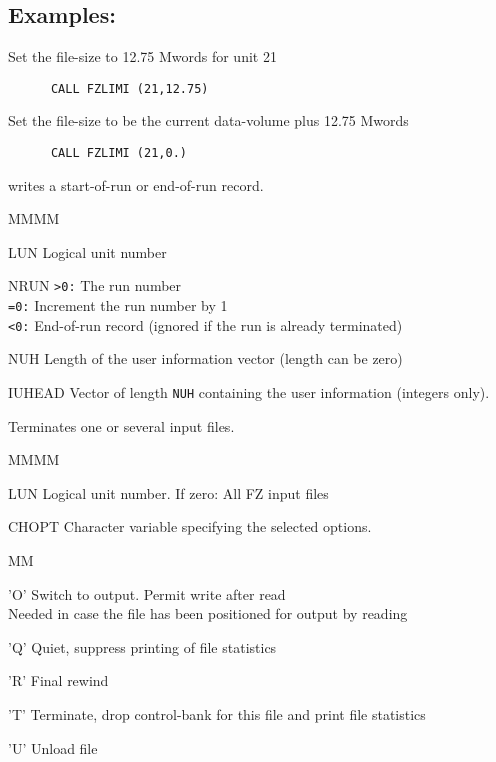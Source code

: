 \subsection{Examples:}
\par Set the file-size to 12.75 Mwords for unit 21
\begin{verbatim}
      CALL FZLIMI (21,12.75)
\end{verbatim}
Set the file-size to be the current data-volume plus 12.75 Mwords
\begin{verbatim}
      CALL FZLIMI (21,0.)
\end{verbatim}
\par writes a start-of-run or end-of-run record.
\Idesc
\begin{DL}{MMMM}
\item[LUN]Logical unit number
\item[NRUN]{\tt>0:} The run number\\
{\tt=0:} Increment the run number by 1 \\
{\tt<0:} End-of-run record
(ignored if the run is already terminated)
\item[NUH]Length of the user information vector (length can be zero)
\item[IUHEAD]Vector of length {\tt NUH}
containing the user information (integers only).
\end{DL}
\par
Terminates one or several input files.
\Idesc
\begin{DL}{MMMM}
\item[LUN]Logical unit number.
If zero: All FZ input files
\item[CHOPT]Character variable specifying the selected options.
\begin{DL}{MM}
\item['O']Switch to output.
Permit write after read    \\
Needed in case the file
has been positioned for output by reading
\item['Q']Quiet, suppress printing of file statistics
\item['R']Final rewind
\item['T']Terminate, drop control-bank for this file
and print file statistics
\item['U']Unload file
\end{DL}
\end{DL}
